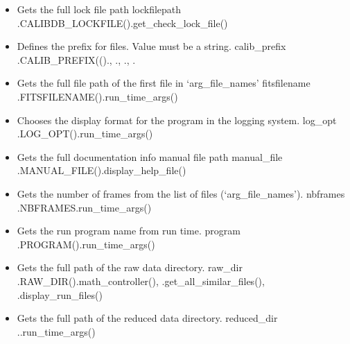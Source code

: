 \begin{itemize}
\item {}
{Gets the full \calibdb lock file path}
{lockfilepath}
{\AllRecipes}{\spirouConst.CALIBDB\_LOCKFILE()}{\spirouCDB.get\_check\_lock\_file()}


\item {}
{Defines the prefix for \calibdb files. Value must be a string.}
{calib\_prefix}
{\AllRecipes}{\spirouConst.CALIB\_PREFIX(()}{\calDARK.\progMAIN, \callocRAW.\progMAIN, \calSLIT.\progMAIN, \calFFraw.\progMAIN}


\item {} 
{Gets the full file path of the first file in `arg\_file\_names'}
{fitsfilename}
{\AllRecipes}{\spirouConst.FITSFILENAME()}{\spirouStartup.run\_time\_args()}


\item {} 
{Chooses the display format for the program in the logging system.}
{log\_opt}
{\AllRecipes}{\spirouConst.LOG\_OPT()}{\spirouStartup.run\_time\_args()}


\item {}
{Gets the full documentation info manual file path}
{manual\_file}
{\AllRecipes}{\spirouConst.MANUAL\_FILE()}{\spirouStartup.display\_help\_file()}


\item {} 
{Gets the number of frames from the list of files (`arg\_file\_names').}
{nbframes}
{\AllRecipes}{\spirouConst.NBFRAMES}{\spirouStartup.run\_time\_args()}


\item {}
{Gets the run program name from run time.}
{program}
{\AllRecipes}{\spirouConst.PROGRAM()}{\spirouStartup.run\_time\_args()}


\item {}
{Gets the full path of the raw data directory.}
{raw\_dir}
{\AllRecipes}{\spirouConst.RAW\_DIR()}{\spirouFITS.math\_controller(), \spirouImage.get\_all\_similar\_files(), \spirouStartup.display\_run\_files()}


\item {} 
{Gets the full path of the reduced data directory.}
{reduced\_dir}
{\AllRecipes}{\spirouConst.}{\spirouStartup.run\_time\_args()}

\end{itemize}

